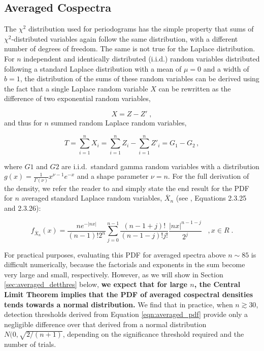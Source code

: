 \documentclass[12pt]{emulateapj}
\begin{document}
\subsection{Averaged Cospectra}
\label{sec:averaged_cospectra}

The $\chi^2$ distribution used for periodograms has the simple property that sums of $\chi^2$-distributed variables again follow the same distribution, with a different number of degrees of freedom. The same is not true for the Laplace distribution. For $n$ independent and identically distributed (i.i.d.) random variables distributed following a standard Laplace distribution with a mean of $\mu = 0$ and a width of $b = 1$, the distribution of the sums of these random variables can be derived using the fact that a single Laplace random variable $X$ can be rewritten as the difference of two exponential random variables, 

\[
X = Z - Z' \; ,
\]
\noindent and thus for $n$ summed random Laplace random variables,

\begin{equation}
T = \sum_{i=1}^{n} X_i = \sum_{i=1}^{n}Z_i - \sum_{i=1}^{n} Z'_i = G_1 - G_2 \, ,
\end{equation}

\noindent where $G1$ and $G2$ are i.i.d.\ standard gamma random variables with a distribution $g(x) = \frac{1}{\Gamma(\nu)} x^{\nu-1} e^{-x}$ and a shape parameter $\nu = n$. For the full derivation of the density, we refer the reader to \citet{kotz2001} and simply state the end result for the PDF for $n$ averaged standard Laplace random variables, $\overline{X}_n$ (see \citealt{kotz2001}, Equations 2.3.25 and 2.3.26):

\begin{equation}
f_{\overline{X}_n}(x) = \frac{n e^{-|nx|}}{(n-1)! 2^n} \sum_{j=0}^{n-1} \frac{(n-1+j)!}{(n-1-j)! j!} \frac{|nx|^{n-1-j}}{2^j} \; \;\;, x \in R \; .
\label{eqn:averaged_pdf}
\end{equation}

For practical purposes, evaluating this PDF for averaged spectra above $n\sim 85$ is difficult numerically, because the factorials and exponents in the sum become very large and small, respectively. However, as we will show in Section \ref{sec:averaged_detthres} below, \textbf{we expect that for large $n$, the Central Limit Theorem implies that the PDF of averaged cospectral densities tends towards a normal distribution.} We find that in practice, when $n \gtrsim 30$, detection thresholds derived from Equation \ref{eqn:averaged_pdf} provide only a negligible difference over that derived from a normal distribution $N(0, \sqrt{2/(n+1)}$, depending on the significance threshold required and the number of trials. 
\end{document}
